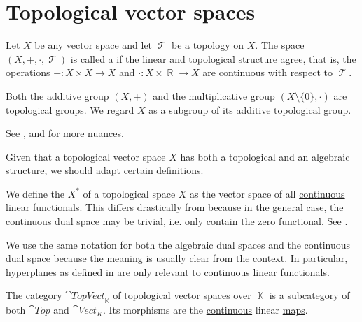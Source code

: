 \section{Topological vector spaces}\label{sec:topological_vector_spaces}

\begin{definition}\label{def:topological_vector_space}
  Let \( X \) be any vector space and let \( \mscrT \) be a topology on \( X \). The space \( (X, +, \cdot, \mscrT) \) is called a  if the linear and topological structure agree, that is, the operations \( +: X \times X \to X \) and \( \cdot: X \times \BbbR \to X \) are continuous with respect to \( \mscrT \).

  Both the additive group \( (X, +) \) and the multiplicative group \( (X \setminus \{ 0 \}, \cdot) \) are \hyperref[def:topological_group]{topological groups}. We regard \( X \) as a subgroup of its additive topological group.

  See ,  and  for more nuances.
\end{definition}

Given that a topological vector space \( X \) has both a topological and an algebraic structure, we should adapt certain definitions.

\begin{definition}\label{def:continuous_dual_space}
  We define the  \( X^* \) of a topological space \( X \) as the vector space of all \hyperref[def:global_continuity]{continuous} linear functionals. This differs drastically from  because in the general case, the continuous dual space may be trivial, i.e. only contain the zero functional. See .

  We use the same notation for both the algebraic dual spaces and the continuous dual space because the meaning is usually clear from the context. In particular, hyperplanes as defined in  are only relevant to continuous linear functionals.
\end{definition}

\begin{definition}\label{def:category_of_topological_vector_spaces}
  The category \( \cat{TopVect}_{\BbbK} \) of topological vector spaces over \( \BbbK \) is a subcategory of both \( \cat{Top} \) and \( \cat{Vect}_K \). Its morphisms are the \hyperref[def:global_continuity]{continuous} linear \hyperref[def:linear_function]{maps}.
\end{definition}

